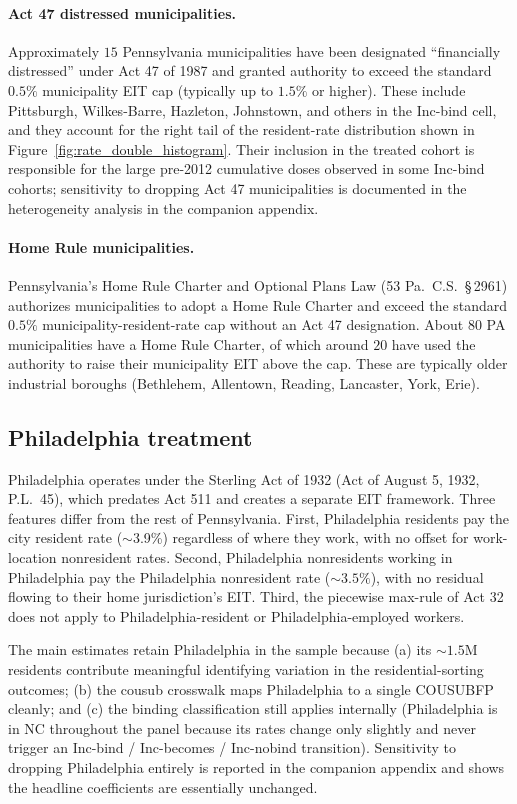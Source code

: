 \documentclass[12pt]{article}
\begin{document}
\paragraph{Act 47 distressed municipalities.}
Approximately $15$ Pennsylvania municipalities have been designated
``financially distressed'' under Act 47 of 1987 \citep{paAct47_1987} and granted authority
to exceed the standard $0.5\%$ municipality EIT cap (typically up to $1.5\%$
or higher). These include Pittsburgh, Wilkes-Barre, Hazleton,
Johnstown, and others in the Inc-bind cell, and they account for the
right tail of the resident-rate distribution shown in
Figure~\ref{fig:rate_double_histogram}. Their inclusion in the
treated cohort is responsible for the large pre-2012 cumulative
doses observed in some Inc-bind cohorts; sensitivity to dropping
Act 47 municipalities is documented in the heterogeneity analysis in the
companion appendix.

\paragraph{Home Rule municipalities.}
Pennsylvania's Home Rule Charter and Optional Plans Law
(53 Pa.~C.S.~\S\,2961) authorizes municipalities to adopt a Home Rule
Charter and exceed the standard $0.5\%$ municipality-resident-rate cap
without an Act 47 designation. About $80$ PA municipalities have a Home Rule
Charter, of which around $20$ have used the authority to raise
their municipality EIT above the cap. These are typically older industrial
boroughs (Bethlehem, Allentown, Reading, Lancaster, York, Erie).

\subsection{Philadelphia treatment}
\label{app:theory-philly}

Philadelphia operates under the Sterling Act of 1932 (Act of August
5, 1932, P.L.~45), which predates Act 511 and creates a separate
EIT framework. Three features differ from the rest of Pennsylvania.
First, Philadelphia residents pay the city resident rate
($\sim$3.9\%) regardless of where they work, with no offset for
work-location nonresident rates. Second, Philadelphia nonresidents
working in Philadelphia pay the Philadelphia nonresident rate
(${\sim}3.5\%$), with no residual flowing to their home
jurisdiction's EIT. Third, the piecewise max-rule of Act 32 does
not apply to Philadelphia-resident or Philadelphia-employed
workers.

The main estimates retain Philadelphia in the sample because (a)
its $\sim 1.5$M residents contribute meaningful identifying
variation in the residential-sorting outcomes; (b) the cousub
crosswalk maps Philadelphia to a single COUSUBFP cleanly; and (c)
the binding classification still applies internally
(Philadelphia is in NC throughout the panel because its rates
change only slightly and never trigger an Inc-bind / Inc-becomes /
Inc-nobind transition). Sensitivity to dropping Philadelphia
entirely is reported in the companion appendix and shows the
headline coefficients are essentially unchanged.
\end{document}
